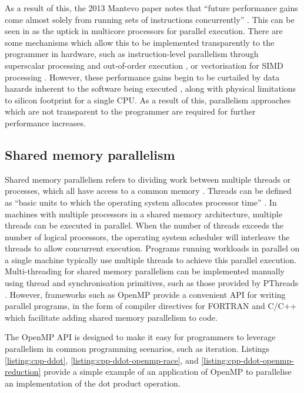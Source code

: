 As a result of this, the 2013 Mantevo paper notes that ``future performance gains come almost solely from running sets of instructions concurrently'' \cite{heroux2013mantevo}. This can be seen in \label{fig:scaling-trends-transistor-clock} as the uptick in multicore processors for parallel execution. There are some mechanisms which allow this to be implemented transparently to the programmer in hardware, such as instruction-level parallelism through superscalar processing and out-of-order execution \cite{pattersonHennessyComputerOrganisationArchitecture}, or vectorisation for SIMD processing \cite{pattersonHennessyComputerOrganisationArchitecture}. However, these performance gains begin to be curtailed by data hazards inherent to the software being executed \cite{shahhoseini1999achieving}, along with physical limitations to silicon footprint for a single CPU. As a result of this, parallelism approaches which are not transparent to the programmer are required for further performance increases.

\subsection{Shared memory parallelism}
\label{ssec:shared-memory-paralellism}

Shared memory parallelism refers to dividing work between multiple threads or processes, which all have access to a common memory  \cite{SharedMemoryParallelism}. Threads can be defined as ``basic units to which the operating system allocates processor time'' \cite{karl-bridge-microsoftProcessesThreadsWin322021}. In machines with multiple processors in a shared memory architecture, multiple threads can be executed in parallel. When the number of threads exceeds the number of logical processors, the operating system scheduler will interleave the threads to allow concurrent execution. Programs running workloads in parallel on a single machine typically use multiple threads to achieve this parallel execution. Multi-threading for shared memory parallelism can be implemented manually using thread and synchronisation primitives, such as those provided by PThreads \cite{nichols1996pthreads}. However, frameworks such as OpenMP \cite{dagumOpenMPIndustryStandard1998} provide a convenient API for writing parallel programs, in the form of compiler directives for FORTRAN and C/C++ which facilitate adding shared memory parallelism to code.

The OpenMP API is designed to make it easy for programmers to leverage parallelism in common programming scenarios, such as iteration. Listings \ref{listing:cpp-ddot}, \ref{listing:cpp-ddot-openmp-race}, and \ref{listing:cpp-ddot-openmp-reduction} provide a simple example of an application of OpenMP to parallelise an implementation of the dot product operation.

